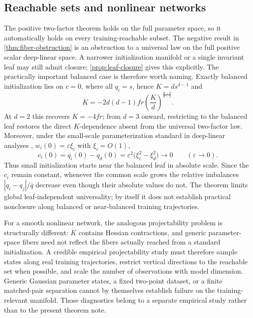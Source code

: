 \documentclass[11pt]{article}
\begin{document}
\subsection{Reachable sets and nonlinear networks}

The positive two-factor theorem holds on the full parameter space, so it automatically holds on every training-reachable subset.  The negative result in \cref{thm:fiber-obstruction} is an obstruction to a universal law on the full positive scalar deep-linear space.  A narrower initialization manifold or a single invariant leaf may still admit closure; \cref{prop:leaf-closure} gives this explicitly.  The practically important balanced case is therefore worth naming.  Exactly balanced initialization lies on $c=0$, where all $q_i=s$, hence $K=d s^{d-1}$ and
\[
  \dot K=-2d(d-1)fr\left(\frac{K}{d}\right)^{\frac{d-2}{d-1}}.
\]
At $d=2$ this recovers $\dot K=-4fr$; from $d=3$ onward, restricting to the balanced leaf restores the direct $K$-dependence absent from the universal two-factor law.  Moreover, under the small-scale parameterization standard in deep-linear analyses \citep{saxe2014deep,arora2018optimization,du2018balanced}, $w_i(0)=\varepsilon\xi_i$ with $\xi_i=O(1)$,
\begin{equation}
  c_i(0)=q_i(0)-q_d(0)
  =\varepsilon^2\bigl(\xi_i^2-\xi_d^2\bigr)\longrightarrow0
  \qquad (\varepsilon\to0).
  \label{eq:near-balanced-initialization}
\end{equation}
Thus small initialization starts near the balanced leaf in absolute scale.  Since the $c_i$ remain constant, whenever the common scale grows the relative imbalances $|q_i-q_j|/\bar q$ decrease even though their absolute values do not.  The theorem limits global leaf-independent universality; by itself it does not establish practical nonclosure along balanced or near-balanced training trajectories.

For a smooth nonlinear network, the analogous projectability problem is structurally different: $\dot K$ contains Hessian contractions, and generic parameter-space fibers need not reflect the fibers actually reached from a standard initialization.  A credible empirical projectability study must therefore sample states along real training trajectories, restrict vertical directions to the reachable set when possible, and scale the number of observations with model dimension.  Generic Gaussian parameter states, a fixed two-point dataset, or a finite matched-pair separation cannot by themselves establish failure on the training-relevant manifold.  Those diagnostics belong to a separate empirical study rather than to the present theorem note.
\end{document}
